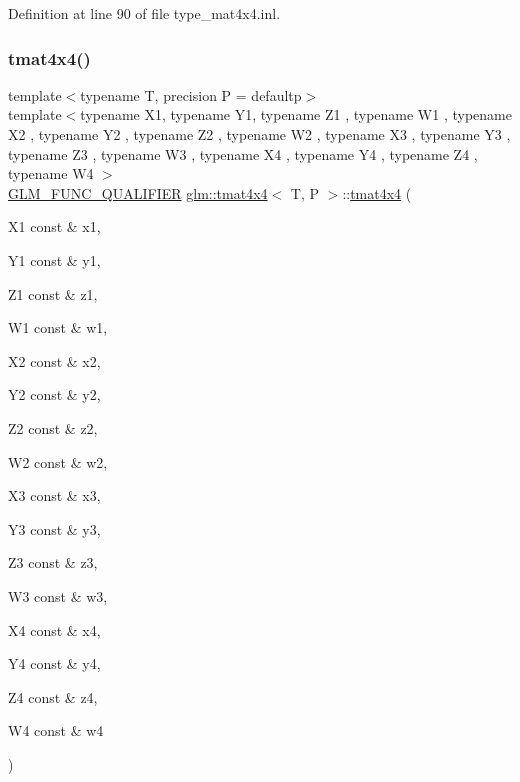 Definition at line 90 of file type\+\_\+mat4x4.\+inl.

\mbox{\label{structglm_1_1tmat4x4_a55fed3aa62bbe056315198d4d7f50db4}} 
\subsubsection{\texorpdfstring{tmat4x4()}{tmat4x4()}\hspace{0.1cm}{\footnotesize\ttfamily [21/22]}}
{\footnotesize\ttfamily template$<$typename T, precision P = defaultp$>$ \\
template$<$typename X1, typename Y1, typename Z1 , typename W1 , typename X2 , typename Y2 , typename Z2 , typename W2 , typename X3 , typename Y3 , typename Z3 , typename W3 , typename X4 , typename Y4 , typename Z4 , typename W4 $>$ \\
\mbox{\hyperlink{setup_8hpp_a33fdea6f91c5f834105f7415e2a64407}{G\+L\+M\+\_\+\+F\+U\+N\+C\+\_\+\+Q\+U\+A\+L\+I\+F\+I\+ER}} \mbox{\hyperlink{structglm_1_1tmat4x4}{glm\+::tmat4x4}}$<$ T, P $>$\+::\mbox{\hyperlink{structglm_1_1tmat4x4}{tmat4x4}} (\begin{DoxyParamCaption}\item[{X1 const \&}]{x1,  }\item[{Y1 const \&}]{y1,  }\item[{Z1 const \&}]{z1,  }\item[{W1 const \&}]{w1,  }\item[{X2 const \&}]{x2,  }\item[{Y2 const \&}]{y2,  }\item[{Z2 const \&}]{z2,  }\item[{W2 const \&}]{w2,  }\item[{X3 const \&}]{x3,  }\item[{Y3 const \&}]{y3,  }\item[{Z3 const \&}]{z3,  }\item[{W3 const \&}]{w3,  }\item[{X4 const \&}]{x4,  }\item[{Y4 const \&}]{y4,  }\item[{Z4 const \&}]{z4,  }\item[{W4 const \&}]{w4 }\end{DoxyParamCaption})}



